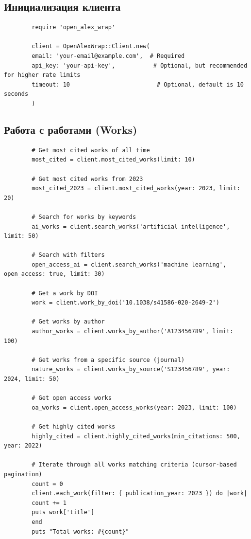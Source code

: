 \documentclass[a4paper,12pt]{article}
\begin{document}
	\subsection{Инициализация клиента}
	
	\begin{lstlisting}
		require 'open_alex_wrap'
		
		client = OpenAlexWrap::Client.new(
		email: 'your-email@example.com',  # Required
		api_key: 'your-api-key',           # Optional, but recommended                                 for higher rate limits
		timeout: 10                         # Optional, default is 10                                     seconds
		)
	\end{lstlisting}
	
	\subsection{Работа с работами (Works)}
	
	\begin{lstlisting}
		# Get most cited works of all time
		most_cited = client.most_cited_works(limit: 10)
		
		# Get most cited works from 2023
		most_cited_2023 = client.most_cited_works(year: 2023, limit: 20)
		
		# Search for works by keywords
		ai_works = client.search_works('artificial intelligence', limit: 50)
		
		# Search with filters
		open_access_ai = client.search_works('machine learning', open_access: true, limit: 30)
		
		# Get a work by DOI
		work = client.work_by_doi('10.1038/s41586-020-2649-2')
		
		# Get works by author
		author_works = client.works_by_author('A123456789', limit: 100)
		
		# Get works from a specific source (journal)
		nature_works = client.works_by_source('S123456789', year: 2024, limit: 50)
		
		# Get open access works
		oa_works = client.open_access_works(year: 2023, limit: 100)
		
		# Get highly cited works
		highly_cited = client.highly_cited_works(min_citations: 500, year: 2022)
		
		# Iterate through all works matching criteria (cursor-based pagination)
		count = 0
		client.each_work(filter: { publication_year: 2023 }) do |work|
		count += 1
		puts work['title']
		end
		puts "Total works: #{count}"
	\end{lstlisting}
	
\end{document}

